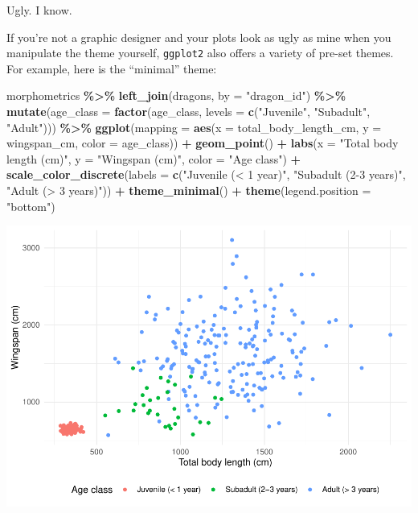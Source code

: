 \documentclass[
]{book}
\newenvironment{Shaded}{\begin{snugshade}}{\end{snugshade}}
\newcommand{\AttributeTok}[1]{\textcolor[rgb]{0.13,0.29,0.53}{#1}}
\newcommand{\FunctionTok}[1]{\textcolor[rgb]{0.13,0.29,0.53}{\textbf{#1}}}
\newcommand{\NormalTok}[1]{#1}
\newcommand{\SpecialCharTok}[1]{\textcolor[rgb]{0.81,0.36,0.00}{\textbf{#1}}}
\newcommand{\StringTok}[1]{\textcolor[rgb]{0.31,0.60,0.02}{#1}}
\begin{document}
Ugly. I know.

If you're not a graphic designer and your plots look as ugly as mine when you
manipulate the theme yourself, \texttt{ggplot2} also offers a variety of pre-set themes.
For example, here is the ``minimal'' theme:

\begin{Shaded}
\begin{Highlighting}[]
\NormalTok{morphometrics }\SpecialCharTok{\%\textgreater{}\%} 
  \FunctionTok{left\_join}\NormalTok{(dragons, }\AttributeTok{by =} \StringTok{"dragon\_id"}\NormalTok{) }\SpecialCharTok{\%\textgreater{}\%} 
  \FunctionTok{mutate}\NormalTok{(}\AttributeTok{age\_class =} \FunctionTok{factor}\NormalTok{(age\_class, }\AttributeTok{levels =} \FunctionTok{c}\NormalTok{(}\StringTok{"Juvenile"}\NormalTok{,}
                                                  \StringTok{"Subadult"}\NormalTok{,}
                                                  \StringTok{"Adult"}\NormalTok{))) }\SpecialCharTok{\%\textgreater{}\%} 
\FunctionTok{ggplot}\NormalTok{(}\AttributeTok{mapping =} \FunctionTok{aes}\NormalTok{(}\AttributeTok{x =}\NormalTok{ total\_body\_length\_cm, }\AttributeTok{y =}\NormalTok{ wingspan\_cm, }\AttributeTok{color =}\NormalTok{ age\_class)) }\SpecialCharTok{+}
  \FunctionTok{geom\_point}\NormalTok{() }\SpecialCharTok{+}
  \FunctionTok{labs}\NormalTok{(}\AttributeTok{x =} \StringTok{"Total body length (cm)"}\NormalTok{, }\AttributeTok{y =} \StringTok{"Wingspan (cm)"}\NormalTok{, }\AttributeTok{color =} \StringTok{"Age class"}\NormalTok{) }\SpecialCharTok{+}
  \FunctionTok{scale\_color\_discrete}\NormalTok{(}\AttributeTok{labels =} \FunctionTok{c}\NormalTok{(}\StringTok{"Juvenile (\textless{} 1 year)"}\NormalTok{,}
                                 \StringTok{"Subadult (2{-}3 years)"}\NormalTok{,}
                                 \StringTok{"Adult (\textgreater{} 3 years)"}\NormalTok{)) }\SpecialCharTok{+}
  \FunctionTok{theme\_minimal}\NormalTok{() }\SpecialCharTok{+}
  \FunctionTok{theme}\NormalTok{(}\AttributeTok{legend.position =} \StringTok{"bottom"}\NormalTok{) }
\end{Highlighting}
\end{Shaded}

\includegraphics{reproducible-science_files/figure-latex/gg13-1.pdf}
\end{document}
